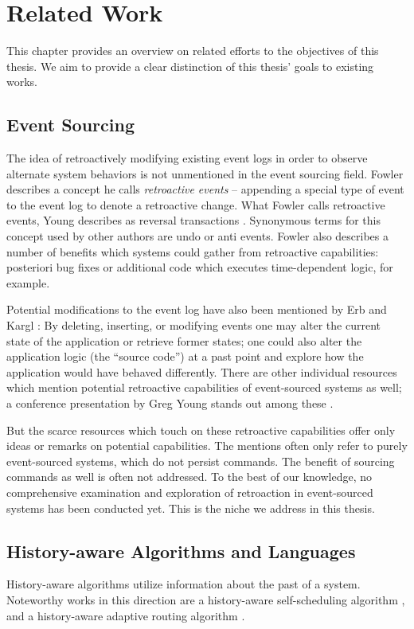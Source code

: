 \chapter{Related Work}
\label{chp:related-work}

This chapter provides an overview on related efforts to the objectives of 
this thesis. We aim to provide a clear distinction of this thesis' goals 
to existing works.

\section{Event Sourcing}

The idea of retroactively modifying existing event logs in order to observe 
alternate system behaviors is not unmentioned in the event sourcing field.
Fowler describes a concept he calls \emph{retroactive events} 
\cite{Fowler2005_2} -- appending a special type of event to the event log to 
denote a retroactive change. 
What Fowler calls retroactive events, Young describes as reversal transactions 
\cite[p.31]{Young2013}. Synonymous terms for this concept used by other authors 
are undo or anti events. 
Fowler also describes a number of benefits which systems could gather from 
retroactive capabilities: posteriori bug fixes or additional code which executes 
time-dependent logic, for example.

Potential modifications to the event log have also been mentioned by Erb and 
Kargl \cite{Erb2014}: By deleting, inserting, or modifying events one may alter 
the current state of the application or retrieve former states; one could also 
alter the application logic (the ``source code'') at a past point and explore 
how the application would have behaved differently.  
There are other individual resources which mention potential retroactive 
capabilities of event-sourced systems as well; a conference presentation by 
Greg Young stands out among these \cite{Young2014}.

But the scarce resources which touch on these retroactive capabilities offer 
only ideas or remarks on potential capabilities. The mentions often only 
refer to purely event-sourced systems, which do not persist commands. The 
benefit of sourcing commands as well is often not addressed. To the best of 
our knowledge, no comprehensive examination and exploration of retroaction in
event-sourced systems has been conducted yet. 
This is the niche we address in this thesis. 

\section{History-aware Algorithms and Languages}
History-aware algorithms utilize information about the past of a system. 
Noteworthy works in this direction are a history-aware self-scheduling 
algorithm \cite{Kejariwal2006}, and a history-aware adaptive routing 
algorithm \cite{Nguyen2013}.

